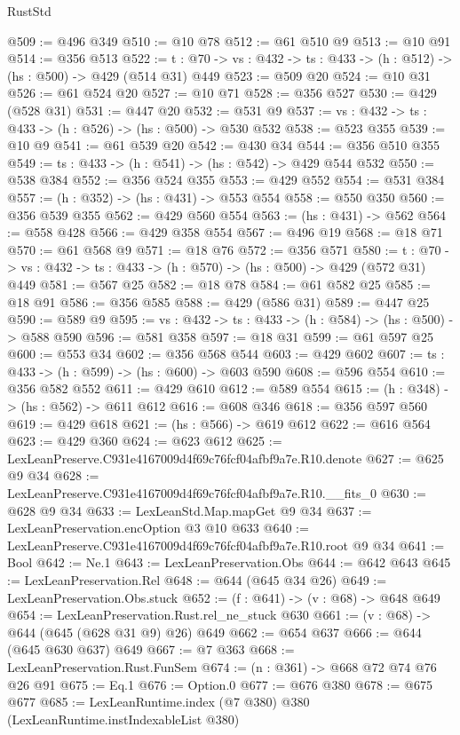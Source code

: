 \begin{lexlean}{RustStd}
\begin{coremodule}
@509 := @496 @349
@510 := @10 @78
@512 := @61 @510 @9
@513 := @10 @91
@514 := @356 @513
@522 := {t : @70} -> {vs : @432} -> {ts : @433} -> (h : @512) -> (hs : @500) -> @429 (@514 @31) @449
@523 := @509 @20
@524 := @10 @31
@526 := @61 @524 @20
@527 := @10 @71
@528 := @356 @527
@530 := @429 (@528 @31)
@531 := @447 @20
@532 := @531 @9
@537 := {vs : @432} -> {ts : @433} -> (h : @526) -> (hs : @500) -> @530 @532
@538 := @523 @355
@539 := @10 @9
@541 := @61 @539 @20
@542 := @430 @34
@544 := @356 @510 @355
@549 := {ts : @433} -> (h : @541) -> (hs : @542) -> @429 @544 @532
@550 := @538 @384
@552 := @356 @524 @355
@553 := @429 @552
@554 := @531 @384
@557 := (h : @352) -> (hs : @431) -> @553 @554
@558 := @550 @350
@560 := @356 @539 @355
@562 := @429 @560 @554
@563 := (hs : @431) -> @562
@564 := @558 @428
@566 := @429 @358 @554
@567 := @496 @19
@568 := @18 @71
@570 := @61 @568 @9
@571 := @18 @76
@572 := @356 @571
@580 := {t : @70} -> {vs : @432} -> {ts : @433} -> (h : @570) -> (hs : @500) -> @429 (@572 @31) @449
@581 := @567 @25
@582 := @18 @78
@584 := @61 @582 @25
@585 := @18 @91
@586 := @356 @585
@588 := @429 (@586 @31)
@589 := @447 @25
@590 := @589 @9
@595 := {vs : @432} -> {ts : @433} -> (h : @584) -> (hs : @500) -> @588 @590
@596 := @581 @358
@597 := @18 @31
@599 := @61 @597 @25
@600 := @553 @34
@602 := @356 @568 @544
@603 := @429 @602
@607 := {ts : @433} -> (h : @599) -> (hs : @600) -> @603 @590
@608 := @596 @554
@610 := @356 @582 @552
@611 := @429 @610
@612 := @589 @554
@615 := (h : @348) -> (hs : @562) -> @611 @612
@616 := @608 @346
@618 := @356 @597 @560
@619 := @429 @618
@621 := (hs : @566) -> @619 @612
@622 := @616 @564
@623 := @429 @360
@624 := @623 @612
@625 := LexLeanPreserve.C931e4167009d4f69c76fcf04afbf9a7e.R10.denote
@627 := @625 @9 @34
@628 := LexLeanPreserve.C931e4167009d4f69c76fcf04afbf9a7e.R10.__fits_0
@630 := @628 @9 @34
@633 := LexLeanStd.Map.mapGet @9 @34
@637 := LexLeanPreservation.encOption @3 @10 @633
@640 := LexLeanPreserve.C931e4167009d4f69c76fcf04afbf9a7e.R10.root @9 @34
@641 := Bool
@642 := Ne.{1}
@643 := LexLeanPreservation.Obs
@644 := @642 @643
@645 := LexLeanPreservation.Rel
@648 := @644 (@645 @34 @26)
@649 := LexLeanPreservation.Obs.stuck
@652 := (f : @641) -> (v : @68) -> @648 @649
@654 := LexLeanPreservation.Rust.rel_ne_stuck @630
@661 := (v : @68) -> @644 (@645 (@628 @31 @9) @26) @649
@662 := @654 @637
@666 := @644 (@645 @630 @637) @649
@667 := @7 @363
@668 := LexLeanPreservation.Rust.FunSem
@674 := (n : @361) -> @668 @72 @74 @76 @26 @91
@675 := Eq.{1}
@676 := Option.{0}
@677 := @676 @380
@678 := @675 @677
@685 := LexLeanRuntime.index (@7 @380) @380 (LexLeanRuntime.instIndexableList @380)

\end{coremodule}
\end{lexlean}
